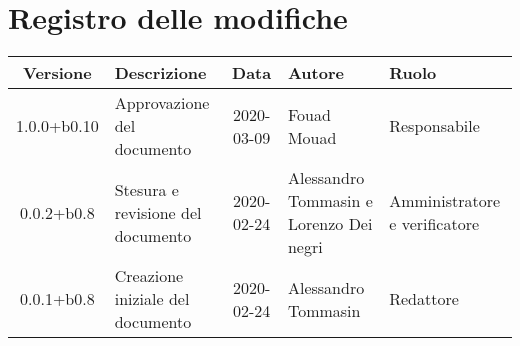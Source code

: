\section*{Registro delle modifiche}

\begin{center}
	\begin{longtable}{|c|p{3.5cm}|c|p{3cm}|p{3cm}|}
	\hline
	\rowcolor{lighter-grayer}
	\textbf{Versione} & \textbf{Descrizione} & \textbf{Data} & \textbf{Autore} & \textbf{Ruolo} \\
	\hline
	\endfirsthead

	1.0.0+b0.10 & Approvazione del documento & 2020-03-09 & Fouad Mouad & Responsabile \\
	\hline
	0.0.2+b0.8 & Stesura e revisione del documento & 2020-02-24 & Alessandro Tommasin e Lorenzo Dei negri & Amministratore e verificatore \\
	\hline
	0.0.1+b0.8 & Creazione iniziale del documento & 2020-02-24 & Alessandro Tommasin & Redattore \\
	\hline

	\end{longtable}
\end{center}